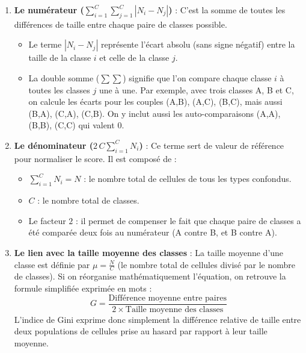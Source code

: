 \documentclass[11pt,a4paper]{article}
\begin{document}
\begin{enumerate}
    \item \textbf{Le numérateur ($\sum_{i=1}^{C} \sum_{j=1}^{C} |N_i - N_j|$)} :
    C'est la somme de toutes les différences de taille entre chaque paire de classes possible. 
    \begin{itemize}
        \item Le terme $|N_i - N_j|$ représente l'écart absolu (sans signe négatif) entre la taille de la classe $i$ et celle de la classe $j$.
        \item La double somme ($\sum\sum$) signifie que l'on compare chaque classe $i$ à toutes les classes $j$ une à une. Par exemple, avec trois classes A, B et C, on calcule les écarts pour les couples (A,B), (A,C), (B,C), mais aussi (B,A), (C,A), (C,B). On y inclut aussi les auto-comparaisons (A,A), (B,B), (C,C) qui valent $0$.
    \end{itemize}
    
    \item \textbf{Le dénominateur ($2 \, C \sum_{i=1}^{C} N_i$)} :
    Ce terme sert de valeur de référence pour normaliser le score. Il est composé de :
    \begin{itemize}
        \item $\sum_{i=1}^{C} N_i = N$ : le nombre total de cellules de tous les types confondus.
        \item $C$ : le nombre total de classes.
        \item Le facteur $2$ : il permet de compenser le fait que chaque paire de classes a été comparée deux fois au numérateur (A contre B, et B contre A).
    \end{itemize}
    
    \item \textbf{Le lien avec la taille moyenne des classes} :
    La taille moyenne d'une classe est définie par $\mu = \frac{N}{C}$ (le nombre total de cellules divisé par le nombre de classes). Si on réorganise mathématiquement l'équation, on retrouve la formule simplifiée exprimée en mots :
    \[
    G = \frac{\text{Différence moyenne entre paires}}{2 \times \text{Taille moyenne des classes}}
    \]
    L'indice de Gini exprime donc simplement la différence relative de taille entre deux populations de cellules prise au hasard par rapport à leur taille moyenne.
    

\end{enumerate}
\end{document}

